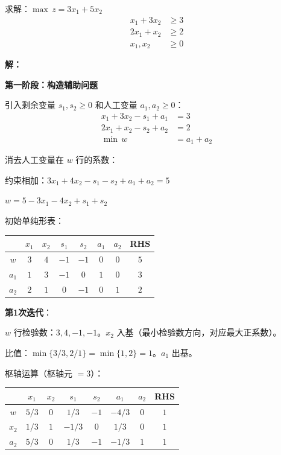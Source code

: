 \begin{example}
求解：$\max \, z = 3x_1 + 5x_2$
\begin{align*}
x_1 + 3x_2 &\geq 3 \\
2x_1 + x_2 &\geq 2 \\
x_1, x_2 &\geq 0
\end{align*}

\textbf{解：}

\textbf{第一阶段：构造辅助问题}

引入剩余变量 $s_1, s_2 \geq 0$ 和人工变量 $a_1, a_2 \geq 0$：
\begin{align*}
x_1 + 3x_2 - s_1 + a_1 &= 3 \\
2x_1 + x_2 - s_2 + a_2 &= 2 \\
\min \, w &= a_1 + a_2
\end{align*}

消去人工变量在 $w$ 行的系数：

约束相加：$3x_1 + 4x_2 - s_1 - s_2 + a_1 + a_2 = 5$

$w = 5 - 3x_1 - 4x_2 + s_1 + s_2$

初始单纯形表：

\begin{table}[H]
\centering
\begin{tabular}{@{}c|cccccc|c@{}}
\toprule
& $x_1$ & $x_2$ & $s_1$ & $s_2$ & $a_1$ & $a_2$ & RHS \\
\midrule
$w$ & $3$ & $4$ & $-1$ & $-1$ & $0$ & $0$ & $5$ \\
\midrule
$a_1$ & $1$ & $3$ & $-1$ & $0$ & $1$ & $0$ & $3$ \\
$a_2$ & $2$ & $1$ & $0$ & $-1$ & $0$ & $1$ & $2$ \\
\bottomrule
\end{tabular}
\end{table}

\textbf{第1次迭代}：

$w$ 行检验数：$3, 4, -1, -1$。$x_2$ 入基（最小检验数方向，对应最大正系数）。

比值：$\min\{3/3, 2/1\} = \min\{1, 2\} = 1$。$a_1$ 出基。

枢轴运算（枢轴元 $= 3$）：

\begin{table}[H]
\centering
\begin{tabular}{@{}c|cccccc|c@{}}
\toprule
& $x_1$ & $x_2$ & $s_1$ & $s_2$ & $a_1$ & $a_2$ & RHS \\
\midrule
$w$ & $5/3$ & $0$ & $1/3$ & $-1$ & $-4/3$ & $0$ & $1$ \\
\midrule
$x_2$ & $1/3$ & $1$ & $-1/3$ & $0$ & $1/3$ & $0$ & $1$ \\
$a_2$ & $5/3$ & $0$ & $1/3$ & $-1$ & $-1/3$ & $1$ & $1$ \\
\bottomrule
\end{tabular}
\end{table}


\end{example}
